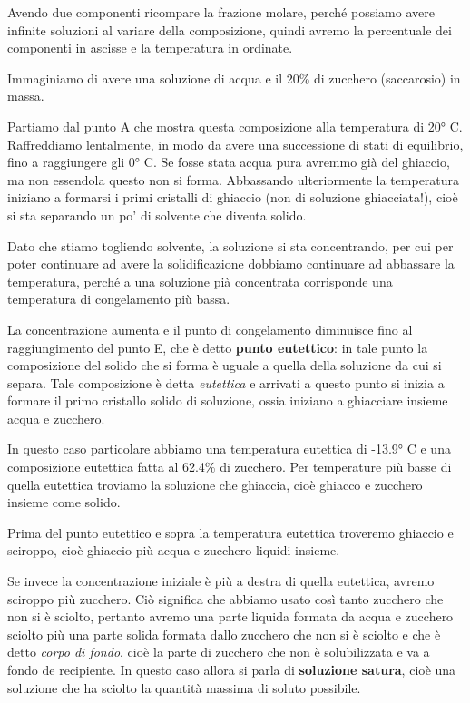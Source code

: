 Avendo due componenti ricompare la frazione molare, perché possiamo avere infinite soluzioni al variare della composizione, quindi avremo la percentuale dei componenti in ascisse e la temperatura in ordinate.

Immaginiamo di avere una soluzione di acqua e il 20\% di zucchero (saccarosio) in massa.

Partiamo dal punto A che mostra questa composizione alla temperatura di 20° C. Raffreddiamo lentalmente, in modo da avere una successione di stati di equilibrio, fino a raggiungere gli 0° C. Se fosse stata acqua pura avremmo già del ghiaccio, ma non essendola questo non si forma. Abbassando ulteriormente la temperatura iniziano a formarsi i primi cristalli di ghiaccio (non di soluzione ghiacciata!), cioè si sta separando un po' di solvente che diventa solido.

Dato che stiamo togliendo solvente, la soluzione si sta concentrando, per cui per poter continuare ad avere la solidificazione dobbiamo continuare ad abbassare la temperatura, perché a una soluzione pià concentrata corrisponde una temperatura di congelamento più bassa.

La concentrazione aumenta e il punto di congelamento diminuisce fino al raggiungimento del punto E, che è detto \textbf{punto eutettico}: in tale punto la composizione del solido che si forma è uguale a quella della soluzione da cui si separa. Tale composizione è detta \textit{eutettica} e arrivati a questo punto si inizia a formare il primo cristallo solido di soluzione, ossia iniziano a ghiacciare insieme acqua e zucchero.

In questo caso particolare abbiamo una temperatura eutettica di -13.9° C e una composizione eutettica fatta al 62.4\% di zucchero. Per temperature più basse di quella eutettica troviamo la soluzione che ghiaccia, cioè ghiacco e zucchero insieme come solido.

Prima del punto eutettico e sopra la temperatura eutettica troveremo ghiaccio e sciroppo, cioè ghiaccio più acqua e zucchero liquidi insieme.

Se invece la concentrazione iniziale è più a destra di quella eutettica, avremo sciroppo più zucchero. Ciò significa che abbiamo usato così tanto zucchero che non si è sciolto, pertanto avremo una parte liquida formata da acqua e zucchero sciolto più una parte solida formata dallo zucchero che non si è sciolto e che è detto \textit{corpo di fondo}, cioè la parte di zucchero che non è solubilizzata e va a fondo de recipiente. In questo caso allora si parla di \textbf{soluzione satura}, cioè una soluzione che ha sciolto la quantità massima di soluto possibile.

